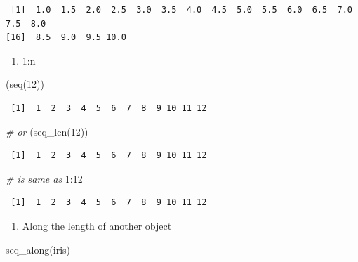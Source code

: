 \documentclass[
]{book}
\newenvironment{Shaded}{\begin{snugshade}}{\end{snugshade}}
\newcommand{\CommentTok}[1]{\textcolor[rgb]{0.56,0.35,0.01}{\textit{#1}}}
\newcommand{\DecValTok}[1]{\textcolor[rgb]{0.00,0.00,0.81}{#1}}
\newcommand{\FunctionTok}[1]{\textcolor[rgb]{0.00,0.00,0.00}{#1}}
\newcommand{\NormalTok}[1]{#1}
\newcommand{\SpecialCharTok}[1]{\textcolor[rgb]{0.00,0.00,0.00}{#1}}
\providecommand{\tightlist}{%
  \setlength{\itemsep}{0pt}\setlength{\parskip}{0pt}}
\begin{document}
\begin{verbatim}
 [1]  1.0  1.5  2.0  2.5  3.0  3.5  4.0  4.5  5.0  5.5  6.0  6.5  7.0  7.5  8.0
[16]  8.5  9.0  9.5 10.0
\end{verbatim}

\begin{enumerate}
\def\labelenumi{\arabic{enumi}.}
\setcounter{enumi}{1}
\tightlist
\item
  1:n
\end{enumerate}

\begin{Shaded}
\begin{Highlighting}[]
\NormalTok{(}\FunctionTok{seq}\NormalTok{(}\DecValTok{12}\NormalTok{))}
\end{Highlighting}
\end{Shaded}

\begin{verbatim}
 [1]  1  2  3  4  5  6  7  8  9 10 11 12
\end{verbatim}

\begin{Shaded}
\begin{Highlighting}[]
\CommentTok{\# or }
\NormalTok{(}\FunctionTok{seq\_len}\NormalTok{(}\DecValTok{12}\NormalTok{))}
\end{Highlighting}
\end{Shaded}

\begin{verbatim}
 [1]  1  2  3  4  5  6  7  8  9 10 11 12
\end{verbatim}

\begin{Shaded}
\begin{Highlighting}[]
\CommentTok{\# is same as}
\DecValTok{1}\SpecialCharTok{:}\DecValTok{12}
\end{Highlighting}
\end{Shaded}

\begin{verbatim}
 [1]  1  2  3  4  5  6  7  8  9 10 11 12
\end{verbatim}

\begin{enumerate}
\def\labelenumi{\arabic{enumi}.}
\setcounter{enumi}{2}
\tightlist
\item
  Along the length of another object
\end{enumerate}

\begin{Shaded}
\begin{Highlighting}[]
\FunctionTok{seq\_along}\NormalTok{(iris)}
\end{Highlighting}
\end{Shaded}
\end{document}
